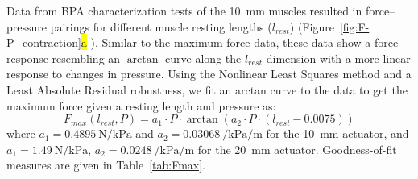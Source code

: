 \documentclass[actuators,article,accept,pdftex,moreauthors]{Definitions/mdpi}
\begin{document}
Data from BPA characterization tests of the \qty{10}{\mm} muscles resulted in force--pressure pairings for different muscle resting lengths ($l_{rest}$) (Figure~\ref{fig:F-P_contraction}\hl{a}%
). Similar to the maximum force data, these data show a force response resembling an $\arctan$ curve along the $l_{rest}$ dimension  with a more linear response to changes in pressure. Using the Nonlinear Least Squares method and a Least Absolute Residual robustness, we fit an arctan curve to the data to get the maximum force given a resting length and pressure as:
\begin{equation}
    F_{max}(l_{rest},P) = a_1 \cdot P \cdot \arctan{(a_2 \cdot P \cdot (l_{rest}-0.0075))} \label{eq:Fmax_3D}
\end{equation}
where $a_1 = \qty{0.4895}{\N\per\kPa}$  and $a_2=\qty{0.03068}{\per\kPa\per\m}$ for the \qty{10}{\mm} actuator, and \mbox{$a_1 = \qty{1.49}{\N\per\kPa}$,} $a_2=\qty{0.0248}{\per\kPa\per\m}$ for the \qty{20}{\mm} actuator. Goodness-of-fit measures are given in Table~\ref{tab:Fmax}. 
\end{document}
